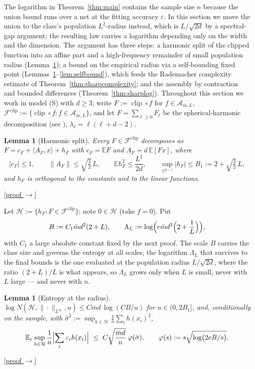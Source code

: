 \documentclass[11pt,reqno]{amsart}
\theoremstyle{plain}
\newtheorem{lemma}[theorem]{Lemma}
\theoremstyle{definition}
\theoremstyle{remark}
\newcommand{\Sd}{\mathbb{S}^{d-1}}
\newcommand{\EE}{\mathbb{E}}
\newcommand{\eps}{\varepsilon}
\newcommand{\AAA}{\mathcal{A}}
\newcommand{\FF}{\mathcal{F}}
\newcommand{\inn}[2]{\langle #1,#2\rangle}
\DeclareMathOperator{\clip}{clip}
\newcommand{\proofbutton}[1]{\hyperref[proof:#1]{\textnormal{\footnotesize\textsf{[proof $\to$]}}}}
\begin{document}
The logarithm in Theorem~\ref{thm:main} contains the sample size $n$ because the union bound runs over a net at the fitting accuracy $\eps$. In this section we move the union to the class's population $L^2$-radius instead, which is $L/\sqrt{2d}$ by a spectral-gap argument; the resulting law carries a logarithm depending only on the width and the dimension. The argument has three steps: a harmonic split of the clipped function into an affine part and a high-frequency remainder of small population radius (Lemma~\ref{lem:hsplit}); a bound on the empirical radius via a self-bounding fixed point (Lemmas~\ref{lem:raddud}--\ref{lem:selfbound}), which feeds the Rademacher complexity estimate of Theorem~\ref{thm:sharpcomplexity}; and the assembly by contraction and bounded differences (Theorem~\ref{thm:sharplog}). Throughout this section we work in model (S) with $d\ge3$; write $F:=\clip\circ f$ for $f\in\AAA_{\bar m,L}$, $\FF^{\clip}:=\{\clip\circ f:f\in\AAA_{\bar m,L}\}$, and let $F=\sum_{\ell\ge0}F_\ell$ be the spherical-harmonic decomposition (see \cite{AtkinsonHan}), $\lambda_\ell=\ell(\ell+d-2)$.

\begin{lemma}[Harmonic split]\label{lem:hsplit}
Every $F\in\FF^{\clip}$ decomposes as $F=c_F+\inn{A_F}{x}+h_F$ with $c_F=\EE F$ and $A_F=d\,\EE[Fx]$, where
\[
|c_F|\le1,\qquad \|A_F\|\le\sqrt{\tfrac32}\,L,\qquad \EE h_F^2\le\frac{L^2}{2d},\qquad \sup_{\Sd}|h_F|\le B_1:=2+\sqrt{\tfrac32}\,L,
\]
and $h_F$ is orthogonal to the constants and to the linear functions.
\end{lemma}
\proofbutton{hsplit}

Let $\mathcal H:=\{h_F:F\in\FF^{\clip}\}$; note $0\in\mathcal H$ (take $f=0$). Put
\[
B:=C_1\bar md^2(2+L),\qquad \Lambda_L:=\log\Bigl(e\bar md^3\Bigl(2+\frac1L\Bigr)\Bigr),
\]
with $C_1$ a large absolute constant fixed by the next proof. The scale $B$ carries the class size and governs the entropy at all scales; the logarithm $\Lambda_L$ that survives to the final bounds is the one evaluated at the population radius $L/\sqrt{2d}$, where the ratio $(2+L)/L$ is what appears, so $\Lambda_L$ grows only when $L$ is small, never with $L$ large --- and never with $n$.

\begin{lemma}[Entropy at the radius]\label{lem:raddud}
$\log N(\mathcal H,\|\cdot\|_{L^\infty},u)\le C\bar md\,\log(CB/u)$ for $u\in(0,2B_1]$, and, conditionally on the sample, with $\hat\sigma^2:=\sup_{h\in\mathcal H}\tfrac1n\sum_ih(x_i)^2$,
\[
\EE_\varepsilon\sup_{h\in\mathcal H}\frac1n\Bigl|\sum_i\varepsilon_ih(x_i)\Bigr|\ \le\ C\sqrt{\frac{\bar md}{n}}\;\varphi(\hat\sigma),\qquad \varphi(s):=s\sqrt{\log\bigl(2eB/s\bigr)} .
\]
\end{lemma}
\proofbutton{raddud}
\end{document}
